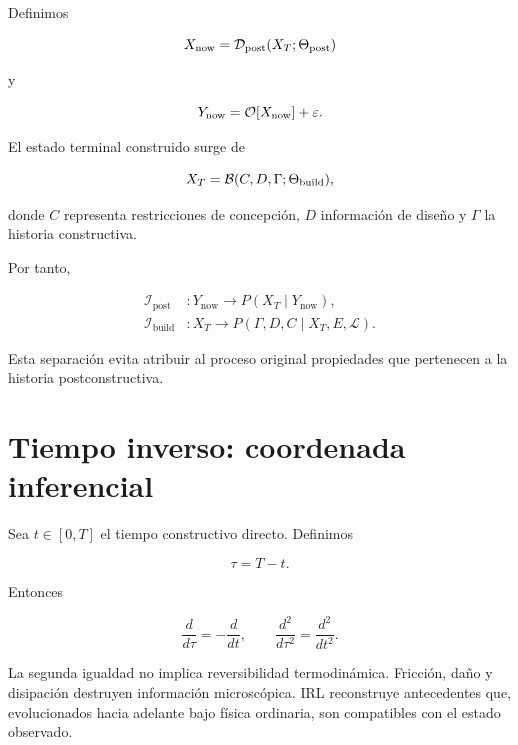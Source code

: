 Definimos

\begin{equation}
X_{\mathrm{now}}
=
\mathcal D_{\mathrm{post}}(X_T;\Theta_{\mathrm{post}})
\end{equation}

y

\begin{equation}
Y_{\mathrm{now}}
=
\mathcal O[X_{\mathrm{now}}]+\varepsilon.
\end{equation}

El estado terminal construido surge de

\begin{equation}
X_T
=
\mathcal B(C,D,\Gamma;\Theta_{\mathrm{build}}),
\end{equation}

donde \(C\) representa restricciones de concepción, \(D\) información de diseño y \(\Gamma\) la historia constructiva.

Por tanto,

\begin{align}
\mathcal I_{\mathrm{post}} &: 
Y_{\mathrm{now}}
\rightarrow
P(X_T\mid Y_{\mathrm{now}}),\\
\mathcal I_{\mathrm{build}} &: 
X_T
\rightarrow
P(\Gamma,D,C\mid X_T,E,\mathcal L).
\end{align}

Esta separación evita atribuir al proceso original propiedades que pertenecen a la historia postconstructiva.

\section{Tiempo inverso: coordenada inferencial}

Sea \(t\in[0,T]\) el tiempo constructivo directo. Definimos

\begin{equation}
\boxed{\tau=T-t.}
\end{equation}

Entonces

\begin{equation}
\frac{d}{d\tau}
=
-\frac{d}{dt},
\qquad
\frac{d^2}{d\tau^2}
=
\frac{d^2}{dt^2}.
\end{equation}

La segunda igualdad no implica reversibilidad termodinámica. Fricción, daño y disipación destruyen información microscópica. IRL reconstruye antecedentes que, evolucionados hacia adelante bajo física ordinaria, son compatibles con el estado observado.

